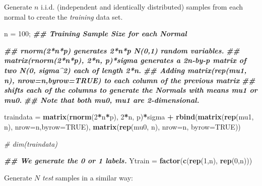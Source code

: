 \documentclass[
]{book}
\newenvironment{Shaded}{\begin{snugshade}}{\end{snugshade}}
\newcommand{\AttributeTok}[1]{\textcolor[rgb]{0.13,0.29,0.53}{#1}}
\newcommand{\CommentTok}[1]{\textcolor[rgb]{0.56,0.35,0.01}{\textit{#1}}}
\newcommand{\ConstantTok}[1]{\textcolor[rgb]{0.56,0.35,0.01}{#1}}
\newcommand{\DecValTok}[1]{\textcolor[rgb]{0.00,0.00,0.81}{#1}}
\newcommand{\DocumentationTok}[1]{\textcolor[rgb]{0.56,0.35,0.01}{\textbf{\textit{#1}}}}
\newcommand{\FunctionTok}[1]{\textcolor[rgb]{0.13,0.29,0.53}{\textbf{#1}}}
\newcommand{\NormalTok}[1]{#1}
\newcommand{\OtherTok}[1]{\textcolor[rgb]{0.56,0.35,0.01}{#1}}
\newcommand{\SpecialCharTok}[1]{\textcolor[rgb]{0.81,0.36,0.00}{\textbf{#1}}}
\begin{document}
Generate \(n\) i.i.d. (independent and identically distributed) samples from each normal to create the \emph{training} data set.

\begin{Shaded}
\begin{Highlighting}[]
\NormalTok{n }\OtherTok{=} \DecValTok{100}\NormalTok{;         }\DocumentationTok{\#\# Training Sample Size for each Normal}

\DocumentationTok{\#\# rnorm(2*n*p) generates 2*n*p  N(0,1) random variables.}
\DocumentationTok{\#\# matrix(rnorm(2*n*p), 2*n, p)*sigma generates a 2n{-}by{-}p matrix of two N(0, sigma\^{}2) each of length 2*n.}
\DocumentationTok{\#\# Adding matrix(rep(mu1, n), nrow=n,byrow=TRUE) to each column of the previous matrix}
\DocumentationTok{\#\#    shifts each of the columns to generate the Normals with means mu1 or mu0.}
\DocumentationTok{\#\# Note that both mu0, mu1 are 2{-}dimensional.}

\NormalTok{traindata }\OtherTok{=} \FunctionTok{matrix}\NormalTok{(}\FunctionTok{rnorm}\NormalTok{(}\DecValTok{2}\SpecialCharTok{*}\NormalTok{n}\SpecialCharTok{*}\NormalTok{p), }\DecValTok{2}\SpecialCharTok{*}\NormalTok{n, p)}\SpecialCharTok{*}\NormalTok{sigma }\SpecialCharTok{+} 
            \FunctionTok{rbind}\NormalTok{(}\FunctionTok{matrix}\NormalTok{(}\FunctionTok{rep}\NormalTok{(mu1, n), }\AttributeTok{nrow=}\NormalTok{n,}\AttributeTok{byrow=}\ConstantTok{TRUE}\NormalTok{), }
            \FunctionTok{matrix}\NormalTok{(}\FunctionTok{rep}\NormalTok{(mu0, n), }\AttributeTok{nrow=}\NormalTok{n, }\AttributeTok{byrow=}\ConstantTok{TRUE}\NormalTok{))}

\CommentTok{\# dim(traindata)}

\DocumentationTok{\#\# We generate the 0 or 1 labels.}
\NormalTok{Ytrain }\OtherTok{=} \FunctionTok{factor}\NormalTok{(}\FunctionTok{c}\NormalTok{(}\FunctionTok{rep}\NormalTok{(}\DecValTok{1}\NormalTok{,n), }\FunctionTok{rep}\NormalTok{(}\DecValTok{0}\NormalTok{,n)))}
\end{Highlighting}
\end{Shaded}

Generate \(N\) \emph{test} samples in a similar way:
\end{document}
